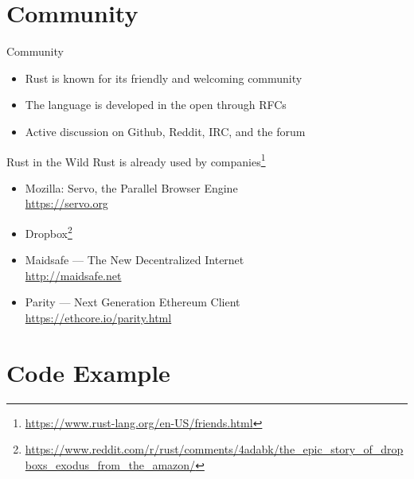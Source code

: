 \documentclass[aspectratio=1610,t]{beamer}
\begin{document}
\section{Community}

\begin{frame}[c]{Community}
  \begin{itemize}
    \item Rust is known for its friendly and welcoming community
    \item The language is developed in the open through RFCs
    \item Active discussion on Github, Reddit, IRC, and the forum
  \end{itemize}
\end{frame}

\begin{frame}[c]{Rust in the Wild}
  Rust is already used by companies\footnote{\url{https://www.rust-lang.org/en-US/friends.html}}
  \begin{itemize}
    \item Mozilla: Servo, the Parallel Browser Engine\\
      {\footnotesize\url{https://servo.org}}
    \item Dropbox\footnote{\url{https://www.reddit.com/r/rust/comments/4adabk/the_epic_story_of_dropboxs_exodus_from_the_amazon/}}
    \item Maidsafe --- The New Decentralized Internet\\
      {\footnotesize\url{http://maidsafe.net}}
    \item Parity --- Next Generation Ethereum Client\\
      {\footnotesize\url{https://ethcore.io/parity.html}}
  \end{itemize}
\end{frame}


\section{Code Example}
\end{document}
